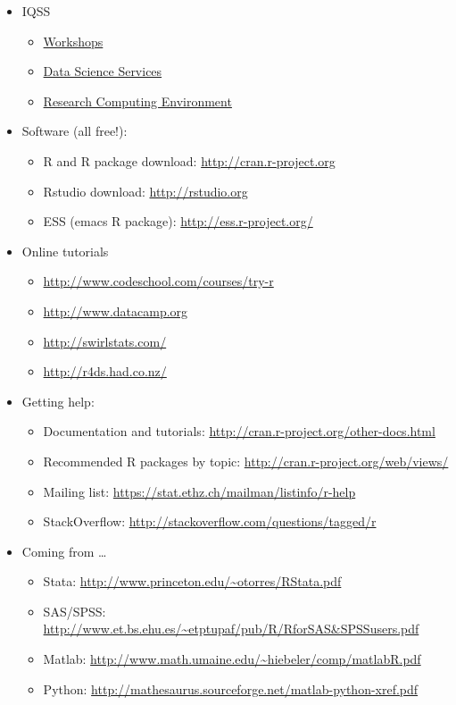 \documentclass[]{book}
\providecommand{\tightlist}{%
  \setlength{\itemsep}{0pt}\setlength{\parskip}{0pt}}
\begin{document}
\begin{itemize}
\tightlist
\item
  IQSS

  \begin{itemize}
  \tightlist
  \item
    \href{https://dss.iq.harvard.edu/workshop-materials}{Workshops}
  \item
    \href{https://dss.iq.harvard.edu/}{Data Science Services}
  \item
    \href{https://iqss.github.io/dss-rce/}{Research Computing
    Environment}
  \end{itemize}
\item
  Software (all free!):

  \begin{itemize}
  \tightlist
  \item
    R and R package download: \url{http://cran.r-project.org}
  \item
    Rstudio download: \url{http://rstudio.org}
  \item
    ESS (emacs R package): \url{http://ess.r-project.org/}
  \end{itemize}
\item
  Online tutorials

  \begin{itemize}
  \tightlist
  \item
    \url{http://www.codeschool.com/courses/try-r}
  \item
    \url{http://www.datacamp.org}
  \item
    \url{http://swirlstats.com/}
  \item
    \url{http://r4ds.had.co.nz/}
  \end{itemize}
\item
  Getting help:

  \begin{itemize}
  \tightlist
  \item
    Documentation and tutorials:
    \url{http://cran.r-project.org/other-docs.html}
  \item
    Recommended R packages by topic:
    \url{http://cran.r-project.org/web/views/}
  \item
    Mailing list: \url{https://stat.ethz.ch/mailman/listinfo/r-help}
  \item
    StackOverflow: \url{http://stackoverflow.com/questions/tagged/r}
  \end{itemize}
\item
  Coming from \ldots{}

  \begin{itemize}
  \tightlist
  \item
    Stata: \url{http://www.princeton.edu/~otorres/RStata.pdf}
  \item
    SAS/SPSS:
    \url{http://www.et.bs.ehu.es/~etptupaf/pub/R/RforSAS\&SPSSusers.pdf}
  \item
    Matlab: \url{http://www.math.umaine.edu/~hiebeler/comp/matlabR.pdf}
  \item
    Python:
    \url{http://mathesaurus.sourceforge.net/matlab-python-xref.pdf}
  \end{itemize}
\end{itemize}
\end{document}
